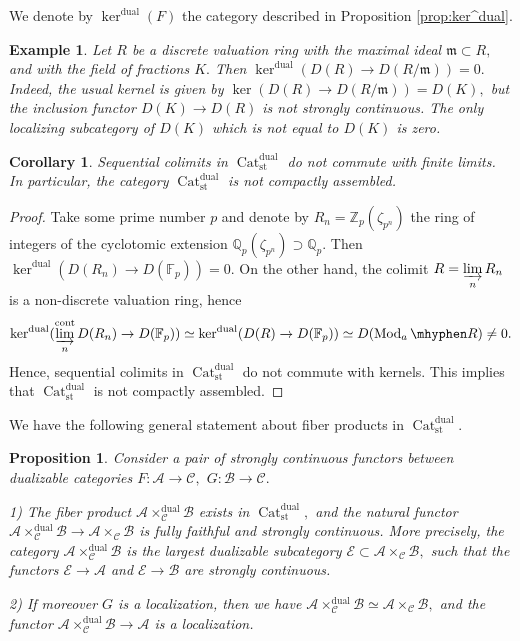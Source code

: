 \documentclass[11pt,leqno]{amsart}
\newtheorem{prop}[theo]{Proposition}
\newtheorem{cor}[theo]{Corollary}
\newtheorem{example}[theo]{Example}
\numberwithin{equation}{section}
\def\Z{\mathbb{Z}}
\def\Q{\mathbb{Q}}
\def\FF{{\mathbb F}}
\newcommand{\hy}{\mhyphen}
\newcommand{\indlim}[1][]{\mathop{\varinjlim}\limits_{#1}}
\newcommand{\Cat}{\operatorname{Cat}}
\newcommand{\cont}{\operatorname{cont}}
\newcommand{\st}{\operatorname{st}}
\newcommand{\dual}{\operatorname{dual}}
\newcommand{\cA}{{\mathcal A}}
\newcommand{\cB}{{\mathcal B}}
\newcommand{\cC}{{\mathcal C}}
\newcommand{\cE}{{\mathcal E}}
\newcommand{\Mod}{\operatorname{Mod}}
\newcommand{\m}{\mathfrak{m}}
\begin{document}
We denote by $\ker^{\dual}(F)$ the category described in Proposition \ref{prop:ker^dual}.

\begin{example}Let $R$ be a discrete valuation ring with the maximal ideal $\m\subset R,$ and with the field of fractions $K.$ Then $\ker^{\dual}(D(R)\to D(R/\m))=0.$ Indeed, the usual kernel is given by $\ker(D(R)\to D(R/\m))=D(K),$ but the inclusion functor $D(K)\to D(R)$ is not strongly continuous. The only localizing subcategory of $D(K)$ which is not equal to $D(K)$ is zero.\end{example}

\begin{cor}\label{cor:seq_colimits_finite_limits} Sequential colimits in $\Cat_{\st}^{\dual}$ do not commute with finite limits. In particular, the category $\Cat_{\st}^{\dual}$ is not compactly assembled.\end{cor}

\begin{proof}Take some prime number $p$ and denote by $R_n=\Z_p(\zeta_{p^n})$ the ring of integers of the cyclotomic extension $\Q_p(\zeta_{p^n})\supset \Q_p.$ Then $\ker^{\dual}(D(R_n)\to D(\FF_p))=0.$ On the other hand, the colimit $R=\indlim[n]R_n$ is a non-discrete valuation ring, hence $$\ker^{\dual}(\indlim[n]^{\cont}D(R_n)\to D(\FF_p))\simeq\ker^{\dual}(D(R)\to D(\FF_p))\simeq D(\Mod_a\hy R)\ne 0.$$
Hence, sequential colimits in $\Cat_{\st}^{\dual}$ do not commute with kernels. This implies that $\Cat_{\st}^{\dual}$ is not compactly assembled.\end{proof}

We have the following general statement about fiber products in $\Cat_{\st}^{\dual}.$

\begin{prop}\label{prop:nice_pullbacks} Consider a pair of strongly continuous functors between dualizable categories $F:\cA\to\cC,$ $G:\cB\to\cC.$ 

1) The fiber product $\cA\times^{\dual}_{\cC}\cB$ exists in $\Cat_{\st}^{\dual},$ and the natural functor $\cA\times^{\dual}_{\cC}\cB\to \cA\times_{\cC}\cB$ is fully faithful and strongly continuous. More precisely, the category $\cA\times^{\dual}_{\cC}\cB$ is the largest dualizable subcategory $\cE\subset \cA\times_{\cC}\cB,$ such that the functors $\cE\to\cA$ and $\cE\to\cB$ are strongly continuous.

2) If moreover $G$ is a localization, then we have $\cA\times^{\dual}_{\cC}\cB\simeq \cA\times_{\cC}\cB,$ and the functor $\cA\times^{\dual}_{\cC}\cB\to\cA$ is a localization.\end{prop}
\end{document}
